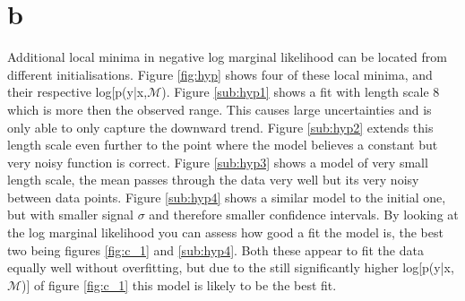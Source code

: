 \documentclass[twoside,twocolumn]{article}
\begin{document}
\section{b}
Additional local minima in negative log marginal likelihood can be located from different initialisations. Figure \ref{fig:hyp} shows four of these local minima, and their respective log[p(y|x,$\mathcal{M}$). Figure \ref{sub:hyp1} shows a fit with length scale 8 which is more then the observed range. This causes large uncertainties and is only able to only capture the downward trend. Figure \ref{sub:hyp2} extends this length scale even further to the point where the model believes a constant but very noisy function is correct. Figure \ref{sub:hyp3} shows a model of very small length scale, the mean passes through the data very well but its very noisy between data points. Figure \ref{sub:hyp4} shows a similar model to the initial one, but with smaller signal $\sigma$ and therefore smaller confidence intervals.
\newline
By looking at the log marginal likelihood you can assess how good a fit the model is, the best two being figures \ref{fig:c_1} and \ref{sub:hyp4}. Both these appear to fit the data equally well without overfitting, but due to the still significantly higher log[p(y|x,$\mathcal{M}$)] of figure \ref{fig:c_1} this model is likely to be the best fit.
\end{document}

